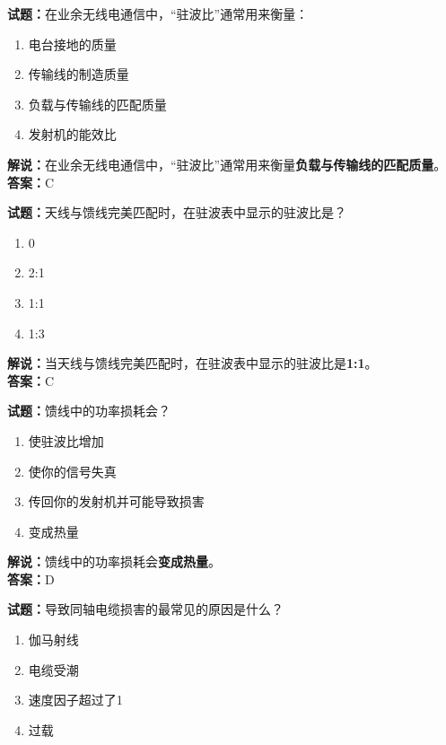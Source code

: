 \documentclass{ctexbook}
\begin{document}
\bigskip


\noindent\textbf{试题：}在业余无线电通信中，“驻波比”通常用来衡量：

\begin{enumerate}[leftmargin=3em]
	\item 电台接地的质量
	\item 传输线的制造质量
	\item 负载与传输线的匹配质量
	\item 发射机的能效比
\end{enumerate}

\noindent\textbf{解说：}在业余无线电通信中，“驻波比”通常用来衡量\textbf{负载与传输线的匹配质量}。\\\noindent\textbf{答案：}C


\bigskip


\noindent\textbf{试题：}天线与馈线完美匹配时，在驻波表中显示的驻波比是？

\begin{enumerate}[leftmargin=3em]
	\item 0
	\item 2:1
	\item 1:1
	\item 1:3
\end{enumerate}

\noindent\textbf{解说：}当天线与馈线完美匹配时，在驻波表中显示的驻波比是\textbf{1:1}。\\\noindent\textbf{答案：}C


\bigskip


\noindent\textbf{试题：}馈线中的功率损耗会？

\begin{enumerate}[leftmargin=3em]
	\item 使驻波比增加
	\item 使你的信号失真
	\item 传回你的发射机并可能导致损害
	\item 变成热量
\end{enumerate}

\noindent\textbf{解说：}馈线中的功率损耗会\textbf{变成热量}。\\\noindent\textbf{答案：}D


\bigskip


\noindent\textbf{试题：}导致同轴电缆损害的最常见的原因是什么？

\begin{enumerate}[leftmargin=3em]
	\item 伽马射线
	\item 电缆受潮
	\item 速度因子超过了1
	\item 过载
\end{enumerate}
\end{document}
